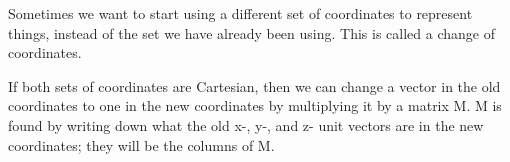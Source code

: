 Sometimes we want to start using a different set of coordinates to represent things,
instead of the set we have already been using. This is called a change of coordinates.
\par
If both sets of coordinates are Cartesian, then we can change a vector in the old 
coordinates to one in the new coordinates by multiplying it by a matrix M. M is found
by writing down what the old x-, y-, and z- unit vectors are in the new coordinates;
they will be the columns of M. 